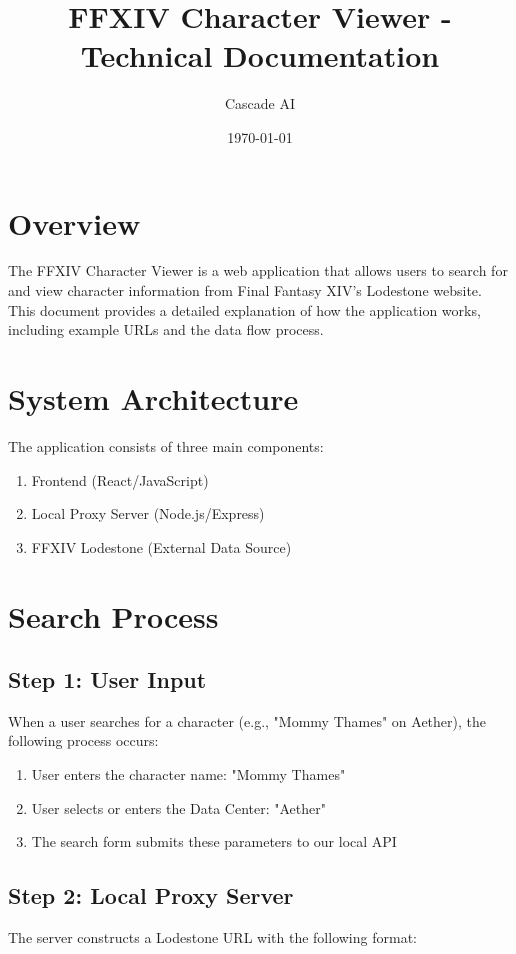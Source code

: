 \documentclass{article}
\title{FFXIV Character Viewer - Technical Documentation}
\author{Cascade AI}
\date{\today}
\begin{document}
\maketitle

\section{Overview}
The FFXIV Character Viewer is a web application that allows users to search for and view character information from Final Fantasy XIV's Lodestone website. This document provides a detailed explanation of how the application works, including example URLs and the data flow process.

\section{System Architecture}
The application consists of three main components:
\begin{enumerate}
    \item Frontend (React/JavaScript)
    \item Local Proxy Server (Node.js/Express)
    \item FFXIV Lodestone (External Data Source)
\end{enumerate}

\section{Search Process}

\subsection{Step 1: User Input}
When a user searches for a character (e.g., "Mommy Thames" on Aether), the following process occurs:

\begin{enumerate}[label=\alph*)]
    \item User enters the character name: "Mommy Thames"
    \item User selects or enters the Data Center: "Aether"
    \item The search form submits these parameters to our local API
\end{enumerate}

\subsection{Step 2: Local Proxy Server}
The server constructs a Lodestone URL with the following format:
\end{document}
